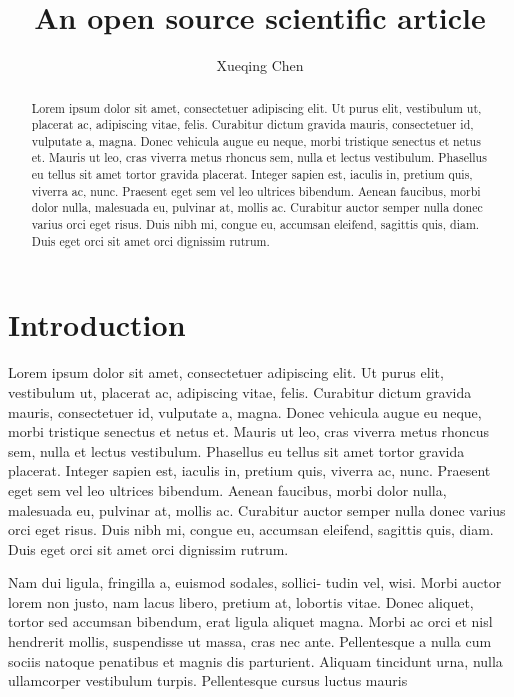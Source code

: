 \documentclass[twocolumn]{aastex631}
\begin{document}
\title{An open source scientific article}

\author{Xueqing Chen}

\begin{abstract}
    Lorem ipsum dolor sit amet, consectetuer adipiscing elit.
    Ut purus elit, vestibulum ut, placerat ac, adipiscing vitae, felis.
    Curabitur dictum gravida mauris, consectetuer id, vulputate a, magna.
    Donec vehicula augue eu neque, morbi tristique senectus et netus et.
    Mauris ut leo, cras viverra metus rhoncus sem, nulla et lectus vestibulum.
    Phasellus eu tellus sit amet tortor gravida placerat.
    Integer sapien est, iaculis in, pretium quis, viverra ac, nunc.
    Praesent eget sem vel leo ultrices bibendum.
    Aenean faucibus, morbi dolor nulla, malesuada eu, pulvinar at, mollis ac.
    Curabitur auctor semper nulla donec varius orci eget risus.
    Duis nibh mi, congue eu, accumsan eleifend, sagittis quis, diam.
    Duis eget orci sit amet orci dignissim rutrum.
\end{abstract}

\section{Introduction}
\label{sec:intro}

Lorem ipsum dolor sit amet, consectetuer adipiscing elit.
Ut purus elit, vestibulum ut, placerat ac, adipiscing vitae, felis.
Curabitur dictum gravida mauris, consectetuer id, vulputate a, magna.
Donec vehicula augue eu neque, morbi tristique senectus et netus et.
Mauris ut leo, cras viverra metus rhoncus sem, nulla et lectus vestibulum.
Phasellus eu tellus sit amet tortor gravida placerat.
Integer sapien est, iaculis in, pretium quis, viverra ac, nunc.
Praesent eget sem vel leo ultrices bibendum.
Aenean faucibus, morbi dolor nulla, malesuada eu, pulvinar at, mollis ac.
Curabitur auctor semper nulla donec varius orci eget risus.
Duis nibh mi, congue eu, accumsan eleifend, sagittis quis, diam.
Duis eget orci sit amet orci dignissim rutrum.

Nam dui ligula, fringilla a, euismod sodales, sollici- tudin vel, wisi.
Morbi auctor lorem non justo, nam lacus libero, pretium at, lobortis vitae.
Donec aliquet, tortor sed accumsan bibendum, erat ligula aliquet magna.
Morbi ac orci et nisl hendrerit mollis, suspendisse ut massa, cras nec ante.
Pellentesque a nulla cum sociis natoque penatibus et magnis dis parturient.
Aliquam tincidunt urna, nulla ullamcorper vestibulum turpis.
Pellentesque cursus luctus mauris
\end{document}
